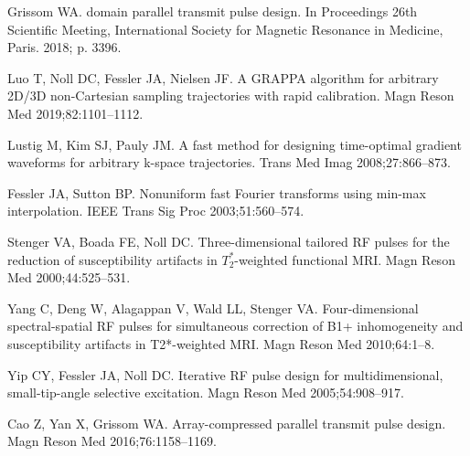 \documentclass[11pt]{article}
\begin{document}
\begin{thebibliography}{10}
Grissom WA.
 domain parallel transmit pulse design.
\newblock In Proceedings 26th Scientific Meeting, International Society for
  Magnetic Resonance in Medicine, Paris. 2018;\hspace{0pt} p. 3396.

Luo T, Noll DC, Fessler JA, Nielsen JF.
\newblock A {GRAPPA} algorithm for arbitrary {2D/3D} non-{Cartesian} sampling
  trajectories with rapid calibration.
\newblock Magn Reson Med 2019;\hspace{0pt}82:1101--1112.

Lustig M, Kim SJ, Pauly JM.
\newblock A fast method for designing time-optimal gradient waveforms for
  arbitrary k-space trajectories.
 Trans Med Imag 2008;\hspace{0pt}27:866--873.

Fessler JA, Sutton BP.
\newblock Nonuniform fast {Fourier} transforms using min-max interpolation.
\newblock IEEE Trans Sig Proc 2003;\hspace{0pt}51:560--574.

Stenger VA, Boada FE, Noll DC.
\newblock Three-dimensional tailored {RF} pulses for the reduction of
  susceptibility artifacts in {$T_2^*$}-weighted functional {MRI}.
\newblock Magn Reson Med 2000;\hspace{0pt}44:525--531.

Yang C, Deng W, Alagappan V, Wald LL, Stenger VA.
\newblock Four-dimensional spectral-spatial {RF} pulses for simultaneous
  correction of {B1+} inhomogeneity and susceptibility artifacts in
  {T2*}-weighted {MRI}.
\newblock Magn Reson Med 2010;\hspace{0pt}64:1--8.

Yip CY, Fessler JA, Noll DC.
\newblock Iterative {RF} pulse design for multidimensional, small-tip-angle
  selective excitation.
\newblock Magn Reson Med 2005;\hspace{0pt}54:908--917.

Cao Z, Yan X, Grissom WA.
\newblock Array-compressed parallel transmit pulse design.
\newblock Magn Reson Med 2016;\hspace{0pt}76:1158--1169.

\end{thebibliography}


\pagebreak
\end{document}
